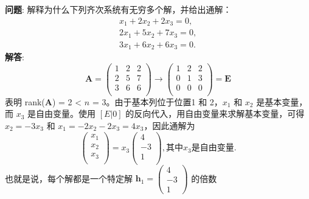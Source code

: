 \textbf{问题}: 解释为什么下列齐次系统有无穷多个解，并给出通解：
\[
\begin{aligned} 
    x_1 + 2x_2 + 2x_3 = 0, \\
    2x_1 + 5x_2 + 7x_3 = 0, \\
    3x_1 + 6x_2 + 6x_3 = 0.
\end{aligned}
\]
\textbf{解答}: 
\[
\mathbf{A} = 
\left(\begin{array}{ccc}
    1 & 2 & 2 \\
    2 & 5 & 7 \\
    3 & 6 & 6 \\
\end{array}\right)\to
\left(\begin{array}{cccc}
    1 & 2 & 2 \\
    0 & 1 & 3 \\
    0 & 0 & 0 \\
\end{array}\right) = \mathbf{E}
\]
表明 rank(\(\mathbf{A}\)) = 2 < \(n\) = 3。由于基本列位于位置1 和 2，\(x_1\) 和 \(x_2\) 是基本变量，而 \(x_3\) 是自由变量。使用
\([E|0]\) 的反向代入，用自由变量来求解基本变量，可得 \(x_2 = -3x_3\) 和 \(x_1 = -2x_2 - 2x_3 = 4x_3\)，因此通解为
\[
\left(\begin{array}{c}
    x_1 \\
    x_2 \\
    x_3 \\
\end{array}\right) = x_3
\left(\begin{array}{c}
    4 \\
    -3 \\
    1 \\
\end{array}\right), \text{其中} x_3 \text{是自由变量}.
\]
也就是说，每个解都是一个特定解 \(\mathbf{h}_1 = \left(\begin{array}{c} 4 \\-3 \\1\end{array}\right)\) 的倍数

